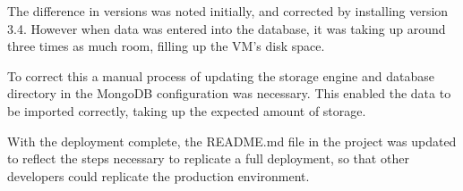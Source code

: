 The difference in versions was noted initially, and corrected by installing version 3.4. However when data was entered into the database, it was taking up around three times as much room, filling up the VM's disk space. 

To correct this a manual process of updating the storage engine and database directory in the MongoDB configuration was necessary. This enabled the data to be imported correctly, taking up the expected amount of storage. 

With the deployment complete, the README.md file in the project was updated to reflect the steps necessary to replicate a full deployment, so that other developers could replicate the production environment. 




